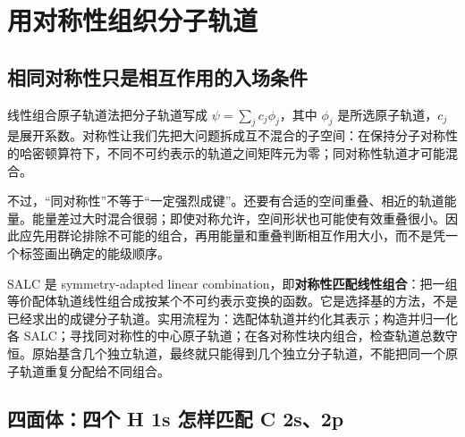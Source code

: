 \section{用对称性组织分子轨道}
\label{sec:orbital-applications}

\subsection{相同对称性只是相互作用的入场条件}

线性组合原子轨道法把分子轨道写成 $\psi=\sum_j c_j\phi_j$，其中 $\phi_j$ 是所选原子轨道，$c_j$ 是展开系数。对称性让我们先把大问题拆成互不混合的子空间：在保持分子对称性的哈密顿算符下，不同不可约表示的轨道之间矩阵元为零；同对称性轨道才可能混合。

不过，“同对称性”不等于“一定强烈成键”。还要有合适的空间重叠、相近的轨道能量。能量差过大时混合很弱；即使对称允许，空间形状也可能使有效重叠很小。因此应先用群论排除不可能的组合，再用能量和重叠判断相互作用大小，而不是凭一个标签画出确定的能级顺序。

SALC 是 symmetry-adapted linear combination，即\textbf{对称性匹配线性组合}：把一组等价配体轨道线性组合成按某个不可约表示变换的函数。它是选择基的方法，不是已经求出的成键分子轨道。实用流程为：选配体轨道并约化其表示；构造并归一化各 SALC；寻找同对称性的中心原子轨道；在各对称性块内组合，检查轨道总数守恒。原始基含几个独立轨道，最终就只能得到几个独立分子轨道，不能把同一个原子轨道重复分配给不同组合。

\subsection{四面体：四个 H 1s 怎样匹配 C 2s、2p}

